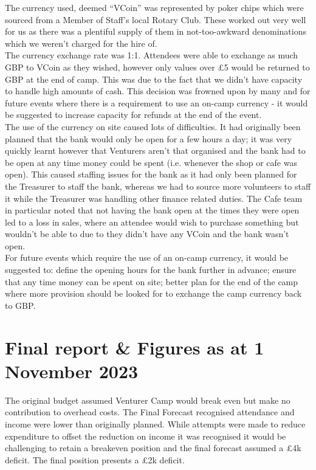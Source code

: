 The currency used, deemed ``VCoin'' was represented by poker chips which were sourced from a Member of Staff's local Rotary Club. These worked out very well for us as there was a plentiful supply of them in not-too-awkward denominations which we weren't charged for the hire of.\\

The currency exchange rate was 1:1. Attendees were able to exchange as much GBP to VCoin as they wished, however only values over \pounds5 would be returned to GBP at the end of camp. This was due to the fact that we didn't have capacity to handle high amounts of cash. This decision was frowned upon by many and for future events where there is a requirement to use an on-camp currency - it would be suggested to increase capacity for refunds at the end of the event.\\

The use of the currency on site caused lots of difficulties. It had originally been planned that the bank would only be open for a few hours a day; it was very quickly learnt however that Venturers aren't that organised and the bank had to be open at any time money could be spent (i.e. whenever the shop or cafe was open). This caused staffing issues for the bank as it had only been planned for the Treasurer to staff the bank, whereas we had to source more volunteers to staff it while the Treasurer was handling other finance related duties. The Cafe team in particular noted that not having the bank open at the times they were open led to a loss in sales, where an attendee would wish to purchase something but wouldn't be able to due to they didn't have any VCoin and the bank wasn't open. \\

For future events which require the use of an on-camp currency, it would be suggested to: define the opening hours for the bank further in advance; ensure that any time money can be spent on site; better plan for the end of the camp where more provision should be looked for to exchange the camp currency back to GBP. 

\section{Final report \& Figures as at 1 November 2023}
The original budget assumed Venturer Camp would break even but make no contribution to overhead costs. The Final Forecast recognised attendance and income were lower than originally planned. While attempts were made to reduce expenditure to offset the reduction on income it was recognised it would be challenging to retain a breakeven position and the final forecast assumed a \pounds4k deficit. The final position presents a \pounds2k deficit.\\

